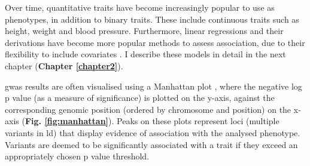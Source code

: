 Over time, quantitative traits have become increasingly popular to use as phenotypes, in addition to binary traits.
These include continuous traits such as height, weight and blood pressure.
Furthermore, linear regressions and their derivations have become more popular methods to assess association, due to their flexibility to include covariates \cite{mccarthy2008genome}.
I describe these models in detail in the next chapter (\textbf{Chapter 
\ref{chapter2}}). 

\newpage

\gls{gwas} results are often visualised using a Manhattan plot \cite{mccarthy2008genome}, where the negative log p value (as a measure of significance) is plotted on the y-axis, against the corresponding genomic position (ordered by chromosome and position) on the x-axis (\textbf{Fig. \ref{fig:manhattan}}). 
Peaks on these plots represent loci (multiple variants in \gls{ld}) that display evidence of association with the analysed phenotype. 
Variants are deemed to be significantly associated with a trait if they exceed an appropriately chosen p value threshold. 

